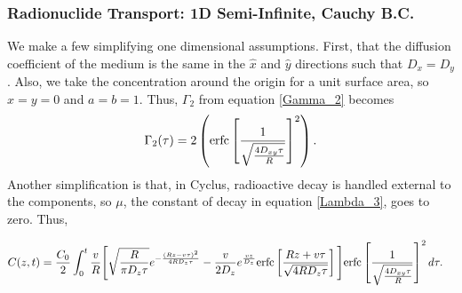 \begin{frame}
\frametitle{Radionuclide Transport: 1D Semi-Infinite, Cauchy B.C.}
\footnotesize{
We make a few simplifying one dimensional assumptions. First, that the diffusion 
coefficient of the medium is the same in the $\hat{x}$ and $\hat{y}$ directions 
such that $D_x=D_y$. Also, we take the concentration around the origin for a 
unit surface area, so $x=y=0$ and $a=b=1$. Thus, $\Gamma_2$ from equation \eqref{Gamma_2} becomes
\begin{align}
  \Gamma_2(\tau) = 2\left(\mathrm{erfc}\left[{\frac{1}{\sqrt{\frac{4D_{xy}\tau}{R}}} 
}\right]^2\right).
\end{align}
Another simplification is that, in Cyclus, radioactive decay is handled external 
to the components, so $\mu$, the constant of decay in equation \eqref{Lambda_3}, 
goes to zero. Thus, 

\begin{align}
  C(z,t)&= \frac{C_0}{2}\int_0^t\frac{v}{R}
  \Bigg[\sqrt{\frac{R}{\pi D_z\tau}}e^{-\frac{(Rz-v\tau)^2}{4RD_z\tau}} -
    \frac{v}{2D_z}e^\frac{vz}{D_z}\mathrm{erfc}\left[{\frac{Rz+v\tau}{\sqrt{4RD_z\tau}}}\right]\Bigg]
    \mathrm{erfc}\left[{\frac{1}{\sqrt{\frac{4D_{xy}\tau}{R}}} }\right]^2
  d\tau .
  \label{simple_leij}
\end{align}
}
\end{frame}
